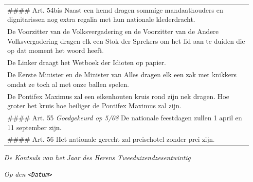\begin{longtable}[]{@{}l@{}}
\begin{minipage}[t]{0.36\columnwidth}
\#\#\#\# Art. 54bis Naast een hemd dragen sommige mandaathouders en
dignitarissen nog extra regalia met hun nationale klederdracht.\strut
\end{minipage}\tabularnewline
\begin{minipage}[t]{0.36\columnwidth}\raggedright
De Voorzitter van de Volksvergadering en de Voorzitter van de Andere
Volksvergadering dragen elk een Stok der Sprekers om het lid aan te
duiden die op dat moment het woord heeft. \strut
\end{minipage}\tabularnewline
\begin{minipage}[t]{0.36\columnwidth}\raggedright
De Linker draagt het Wetboek der Idioten op papier.\strut
\end{minipage}\tabularnewline
\begin{minipage}[t]{0.36\columnwidth}\raggedright
De Eerste Minister en de Minister van Alles dragen elk een zak met
knikkers omdat ze toch al met onze ballen spelen. \strut
\end{minipage}\tabularnewline
\begin{minipage}[t]{0.36\columnwidth}\raggedright
De Pontifex Maximus zal een eikenhouten kruis rond zijn nek dragen. Hoe
groter het kruis hoe heiliger de Pontifex Maximus zal zijn.\strut
\end{minipage}\tabularnewline
\begin{minipage}[t]{0.36\columnwidth}\raggedright
\#\#\#\# Art. 55 \emph{Goedgekeurd op 5/08} De nationale feestdagen
zullen 1 april en 11 september zijn.\strut
\end{minipage}\tabularnewline
\begin{minipage}[t]{0.36\columnwidth}\raggedright
\#\#\#\# Art. 56 Het nationale gerecht zal preischotel zonder prei
zijn.\strut
\end{minipage}\tabularnewline
\bottomrule
\end{longtable}

\emph{De Kontsuls van het Jaar des Herens Tweeduizendzesentwintig}

\emph{Op den \texttt{\textless{}Datum\textgreater{}}}
